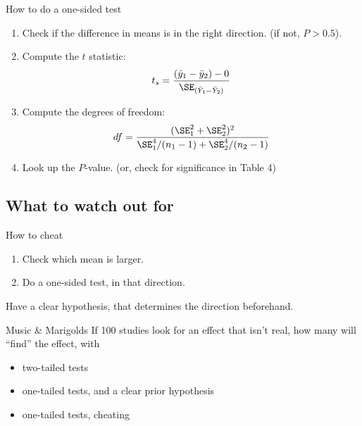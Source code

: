 \begin{frame}{How to do a one-sided test}

  \begin{center}
  \end{center}

  \vspace{-1em}

  \begin{enumerate}
    \item Check if the difference in means is in the right direction. (if not, $P>0.5$).

    \item Compute the $t$ statistic:
      \[
          t_s = \frac{ (\bar y_1 - \bar y_2) - 0}{ \SE_{(\bar Y_1 - \bar Y_2)} }
      \]

    \item Compute the degrees of freedom:
        \[
            df = \frac{ (\SE_1^2 + \SE_2^2)^2 }{ \SE_1^4 / (n_1-1) + \SE_2^4 / (n_2 - 1) }
        \]

    \item Look up the $P$-value. (or, check for significance in Table 4)

  \end{enumerate}


\end{frame}

\subsection{What to watch out for}

%
\begin{frame}{How to cheat}

  \begin{enumerate}
    \item Check which mean is larger.
    \item Do a one-sided test, in that direction.
  \end{enumerate}

  \vspace{2em}

   Have a clear hypothesis, that determines the direction beforehand.

  \vspace{2em}

  \begin{block}{Music \& Marigolds}
    If 100 studies look for an effect that isn't real, 
    how many will ``find'' the effect, with
    \begin{itemize}
      \item[\bf (a)] two-tailed tests
      \item[\bf (b)] one-tailed tests, and a clear prior hypothesis
      \item[\bf (c)] one-tailed tests, cheating
    \end{itemize}
  \end{block}

\end{frame}



